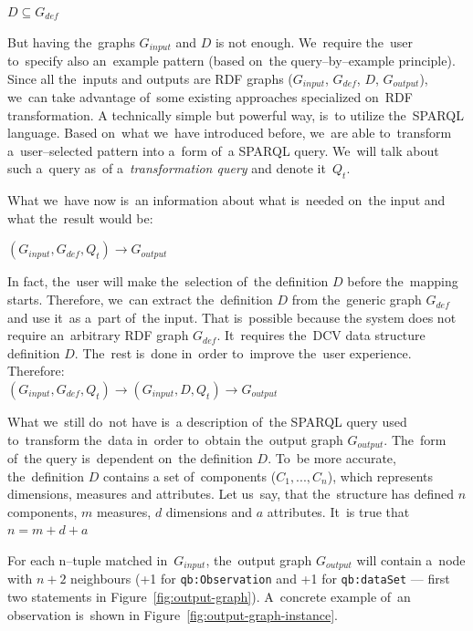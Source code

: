 {\centering $D \subseteq G_{def}$ \\[0.5cm]}

But having the~graphs $G_{input}$ and $D$ 
is not enough. We~require the~user to~specify also an~example pattern (based on~the
query--by--example principle). Since all the~inputs and outputs are RDF
graphs ($G_{input}$, $G_{def}$, $D$, $G_{output}$), we~can take 
advantage of~some existing approaches specialized on~RDF transformation. 
A technically simple but powerful way, is~to utilize the~SPARQL language. Based on~what we~have introduced before, we~are able to~transform a~user--selected pattern into a~form of~a SPARQL
query. We~will talk about such a~query as~of a~\emph{transformation query} and denote it~$Q_t$.

What we~have now is~an information about what is~needed on~the input and 
what the~result would be:

{\centering $(G_{input}, G_{def}, Q_t) \rightarrow G_{output}$ \\[0.5cm]}

In fact, the~user will make the~selection of~the definition $D$ before the~mapping starts. Therefore, we~can extract the~definition $D$ from the~generic graph $G_{def}$ and use it~as a~part of~the input. That is~possible because 
the system does not require an~arbitrary RDF graph $G_{def}$. It~requires the~DCV 
data structure definition $D$. The~rest is~done in~order to~improve the~user 
experience. Therefore:\\

{\centering $(G_{input}, G_{def}, Q_t) \rightarrow (G_{input}, D, Q_t) \rightarrow G_{output}$  \\[0.5cm]}

What we~still do~not have is~a description of~the SPARQL query used to~transform the~data in~order to~obtain the~output graph $G_{output}$. The~form of~the query is~dependent on~the 
definition $D$. To~be more accurate, the~definition $D$ contains
a set of~components ($C_1, ... , C_n$), which represents dimensions, measures and attributes. Let us~say, that the~structure has defined $n$ components, $m$ measures, $d$ dimensions and $a$ 
attributes. It~is true that\\

{\centering $n = m+d+a$ \\[0.5cm]}

For each n--tuple matched in~$G_{input}$, the~output graph $G_{output}$ will contain a~node with $n+2$ 
neighbours (+1 for \verb|qb:Observation| and +1 for \verb|qb:dataSet| --- first two statements
in Figure~\ref{fig:output-graph}). A~concrete example of~an observation is~shown 
in Figure~\ref{fig:output-graph-instance}.

